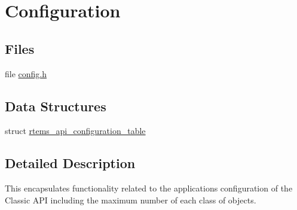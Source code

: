 \hypertarget{group__ClassicConfig}{}\section{Configuration}
\label{group__ClassicConfig}
\subsection*{Files}
\begin{DoxyCompactItemize}
\item 
file \mbox{\hyperlink{include_2rtems_2rtems_2config_8h}{config.\+h}}
\end{DoxyCompactItemize}
\subsection*{Data Structures}
\begin{DoxyCompactItemize}
\item 
struct \mbox{\hyperlink{structrtems__api__configuration__table}{rtems\+\_\+api\+\_\+configuration\+\_\+table}}
\end{DoxyCompactItemize}


\subsection{Detailed Description}
This encapsulates functionality related to the application\textquotesingle{}s configuration of the Classic A\+PI including the maximum number of each class of objects. 